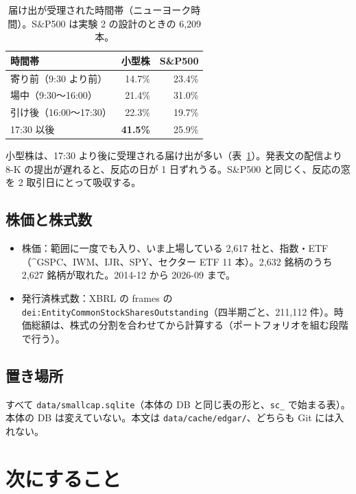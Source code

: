 \documentclass[xelatex,ja=standard,jafont=haranoaji,a4paper,10pt,openany]{bxjsreport}
\newcommand{\code}[1]{\texttt{#1}}
\newcommand{\SP}{S\&P500}
\newcommand{\tabref}[1]{表~\ref{#1}}
\begin{document}
\begin{table}[H]
\centering
\caption{届け出が受理された時間帯（ニューヨーク時間）。\SP{} は実験 2 の設計のときの 6,209 本。}
\label{tab:session}
\small
\begin{tabular}{lrr}
\toprule
時間帯 & 小型株 & \SP{} \\
\midrule
寄り前（9:30 より前） & 14.7\% & 23.4\% \\
場中（9:30〜16:00） & 21.4\% & 31.0\% \\
引け後（16:00〜17:30） & 22.3\% & 19.7\% \\
17:30 以後 & \textbf{41.5\%} & 25.9\% \\
\bottomrule
\end{tabular}
\end{table}

小型株は、17:30 より後に受理される届け出が多い（\tabref{tab:session}）。発表文の配信より 8-K の提出が遅れると、反応の日が 1 日ずれうる。\SP{} と同じく、反応の窓を 2 取引日にとって吸収する。

\section{株価と株式数}

\begin{itemize}
\item 株価：範囲に一度でも入り、いま上場している 2,617 社と、指数・ETF（\^{}GSPC、IWM、IJR、SPY、セクター ETF 11 本）。2,632 銘柄のうち 2,627 銘柄が取れた。2014-12 から 2026-09 まで。
\item 発行済株式数：XBRL の frames の \code{dei:EntityCommonStockSharesOutstanding}（四半期ごと、211,112 件）。時価総額は、株式の分割を合わせてから計算する（ポートフォリオを組む段階で行う）。
\end{itemize}

\section{置き場所}

すべて \code{data/smallcap.sqlite}（本体の DB と同じ表の形と、\code{sc\_} で始まる表）。本体の DB は変えていない。本文は \code{data/cache/edgar/}、どちらも Git には入れない。

\chapter{次にすること}\label{ch:next}
\end{document}
